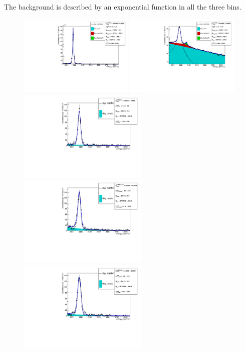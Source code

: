 The background is described by an exponential function in all the three \qsq bins.
%
\begin{figure}[h!]
\centering
\includegraphics[width=0.49\textwidth]{RKst/figs/Fit/fit_MM/KstJPsMM.pdf}
\includegraphics[width=0.49\textwidth]{RKst/figs/Fit/fit_MM/KstJPsMM_log.pdf}
\includegraphics[width=0.55\textwidth]{RKst/figs/Fit/fit_MM/KstMM_low.pdf}
\includegraphics[width=0.55\textwidth]{RKst/figs/Fit/fit_MM/KstMM_central.pdf}
\includegraphics[width=0.55\textwidth]{RKst/figs/Fit/fit_MM/KstMM_high.pdf}

\end{figure}
